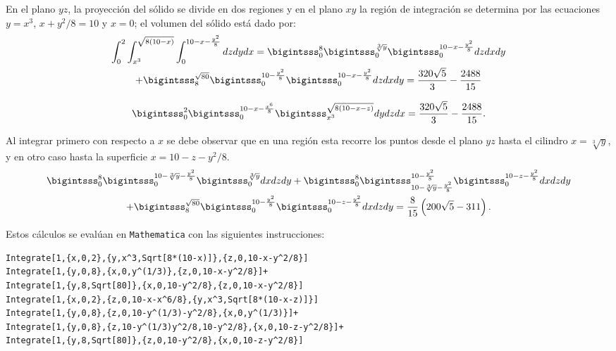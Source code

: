 En el plano $yz$, la proyección del sólido se divide en dos regiones y en el plano $xy$ la región de integración se determina por las ecuaciones $y=x^3$, $x+y^2/8=10$ y $x=0$; el volumen del sólido está dado por:
\begin{gather*}
\int_0^2\int_{x^3}^{\sqrt{8 (10-x)}}\int_0^{10-x-\frac{y^2}{8}}dzdydx=
\bigintsss _0^8\bigintsss _0^{\sqrt[3]{y}}\bigintsss _0^{10-x-\frac{y^2}{8}}dzdxdy \\
+\bigintsss_8^{\sqrt{80}}\bigintsss_0^{10-\frac{y^2}{8}}\bigintsss_0^{10-x-\frac{y^2}{8}}dzdxdy=\frac{320 \sqrt{5}}{3}-\frac{2488}{15}
\end{gather*}

\clearpage

\vspace*{-1.8\baselineskip}

\begingroup
\setlength{\abovedisplayskip}{0pt}
\setlength{\abovedisplayshortskip}{0pt}
\begin{gather*}
  \bigintsss_0^2\bigintsss_0^{10-x-\frac{x^6}{8}}\bigintsss_{x^3}^{\sqrt{8(10-x-z)}}dydzdx=\frac{320\sqrt{5}}{3}-\frac{2488}{15}.
\end{gather*}
\endgroup

Al integrar primero con respecto a $x$ se debe observar que en una región esta recorre los puntos desde el plano $yz$ hasta el cilindro $x=\sqrt[3]{y}$, y en otro caso hasta la superficie $x=10-z-y^2/8$.
\begin{gather*}
\bigintsss _0^8\bigintsss _0^{10-\sqrt[3]{y}-\frac{y^2}{8}}\bigintsss _0^{\sqrt[3]{y}}dxdzdy+\bigintsss _0^8\bigintsss_{10-\sqrt[3]{y}-\frac{y^2}{8}}^{10-\frac{y^2}{8}}\bigintsss _0^{10-z-\frac{y^2}{8}}dxdzdy\\ +\bigintsss_8^{\sqrt{80}}\bigintsss
_0^{10-\frac{y^2}{8}}\bigintsss _0^{10-z-\frac{y^2}{8}}dxdzdy = \frac{8}{15} \left(200 \sqrt{5}-311\right).
\end{gather*}

Estos cálculos se evalúan en \verb"Mathematica" con las siguientes instrucciones:

%

\begin{tcolorbox}[title=\bf Instrucción en \verb"Mathematica"]\begin{Verbatim}[formatcom=\letraverbatim]
Integrate[1,{x,0,2},{y,x^3,Sqrt[8*(10-x)]},{z,0,10-x-y^2/8}]
Integrate[1,{y,0,8},{x,0,y^(1/3)},{z,0,10-x-y^2/8}]+
Integrate[1,{y,8,Sqrt[80]},{x,0,10-y^2/8},{z,0,10-x-y^2/8}]
Integrate[1,{x,0,2},{z,0,10-x-x^6/8},{y,x^3,Sqrt[8*(10-x-z)]}]
Integrate[1,{y,0,8},{z,0,10-y^(1/3)-y^2/8},{x,0,y^(1/3)}]+
Integrate[1,{y,0,8},{z,10-y^(1/3)y^2/8,10-y^2/8},{x,0,10-z-y^2/8}]+
Integrate[1,{y,8,Sqrt[80]},{z,0,10-y^2/8},{x,0,10-z-y^2/8}]
\end{Verbatim}
\end{tcolorbox}

